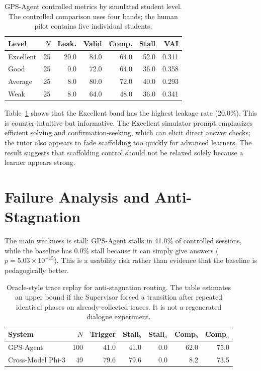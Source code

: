 \documentclass[11pt]{article}
\begin{document}
\begin{table}[t]
\centering
\small
\begin{tabular}{lrrrrrr}
\toprule
Level & $N$ & Leak. & Valid & Comp. & Stall & VAI \\
\midrule
Excellent & 25 & 20.0 & 84.0 & 64.0 & 52.0 & 0.311 \\
Good & 25 & 0.0 & 72.0 & 64.0 & 36.0 & 0.358 \\
Average & 25 & 8.0 & 80.0 & 72.0 & 40.0 & 0.293 \\
Weak & 25 & 8.0 & 64.0 & 48.0 & 36.0 & 0.341 \\
\bottomrule
\end{tabular}
\caption{GPS-Agent controlled metrics by simulated student level. The controlled comparison uses four bands; the human pilot contains five individual students.}
\label{tab:levels}
\end{table}

Table~\ref{tab:levels} shows that the Excellent band has the highest leakage rate (20.0\%). This is counter-intuitive but informative. The Excellent simulator prompt emphasizes efficient solving and confirmation-seeking, which can elicit direct answer checks; the tutor also appears to fade scaffolding too quickly for advanced learners. The result suggests that scaffolding control should not be relaxed solely because a learner appears strong.

\section{Failure Analysis and Anti-Stagnation}
The main weakness is stall: GPS-Agent stalls in 41.0\% of controlled sessions, while the baseline has 0.0\% stall because it can simply give answers ($p=5.03\times10^{-15}$). This is a usability risk rather than evidence that the baseline is pedagogically better.

\begin{table}[t]
\centering
\small
\begin{tabular}{lrrrrrr}
\toprule
System & $N$ & Trigger & Stall$_b$ & Stall$_a$ & Comp$_b$ & Comp$_a$ \\
\midrule
GPS-Agent & 100 & 41.0 & 41.0 & 0.0 & 62.0 & 75.0 \\
Cross-Model Phi-3 & 49 & 79.6 & 79.6 & 0.0 & 8.2 & 73.5 \\
\bottomrule
\end{tabular}
\caption{Oracle-style trace replay for anti-stagnation routing. The table estimates an upper bound if the Supervisor forced a transition after repeated identical phases on already-collected traces. It is not a regenerated dialogue experiment.}
\label{tab:ablation}
\end{table}
\end{document}
